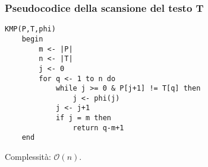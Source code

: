 \subsubsection{Pseudocodice della scansione del testo T}

\begin{lstlisting}
KMP(P,T,phi)
    begin
        m <- |P|
        n <- |T|
        j <- 0
        for q <- 1 to n do
            while j >= 0 & P[j+1] != T[q] then
                j <- phi(j)
            j <- j+1
            if j = m then
                return q-m+1
    end
\end{lstlisting}

Complessità: $\mathcal{O}(n)$.
